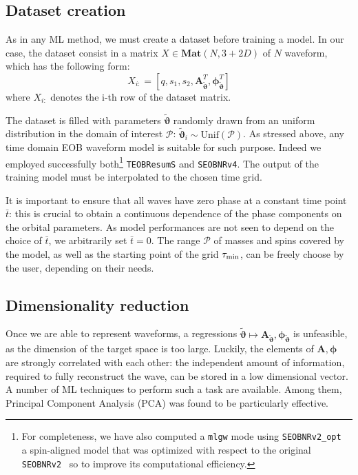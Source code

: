 \documentclass[twocolumn,showpacs,preprintnumbers,nofootinbib,prd,
superscriptaddress,10pt]{revtex4-1}
\begin{document}
\subsection{Dataset creation}
\label{sec:trainingset}
As in any ML method, we must create a dataset before training a model.
In our case, the dataset consist in a matrix ${X \in \mathbf{Mat}(N,3+2D)}$ of $N$ waveform, which has the following form:
\begin{equation} \label{eq:dataset}
	X_{i:} = [q,s_1,s_2, \boldsymbol{A}_{{\tilde{\boldsymbol{\vartheta}}}}^T, \boldsymbol{\phi}_{{\tilde{\boldsymbol{\vartheta}}}}^T]
\end{equation}
where $X_{i:}$ denotes the i-th row of the dataset matrix.

The dataset is filled with parameters ${\tilde{\boldsymbol{\vartheta}}}$ randomly drawn from an uniform distribution in the domain of interest $\mathcal{P}$: ${\tilde{\boldsymbol{\vartheta}}}_i \sim \textrm{Unif}(\mathcal{P})$.
As stressed above, any time domain EOB waveform model is suitable for such purpose. Indeed we employed 
successfully both\footnote{For completeness, we have also computed a {\tt mlgw} 
mode using \texttt{SEOBNRv2\_opt}~\cite{Devine:2016ovp}  a spin-aligned model that was optimized
with respect to the original \texttt{SEOBNRv2}~\cite{Taracchini:2013rva} 
so to improve its computational efficiency.} \texttt{TEOBResumS} and \texttt{SEOBNRv4}.
The output of the training model must be interpolated to the chosen time grid.

It is important to ensure that all waves have zero phase at a constant
time point $\bar{t}$: this is crucial to obtain a continuous
dependence of the phase components on the orbital parameters. As model
performances are not seen to depend on the choice of
$\bar{t}$, we arbitrarily set $\bar{t} = 0$.
The range $\mathcal{P}$ of masses and spins covered by the model, as 
well as the starting point of the grid $\tau_{\rm min}$, can be freely choose 
by the user, depending on their needs.


\subsection{Dimensionality reduction}
Once we are able to represent waveforms, a regressions ${\tilde{\boldsymbol{\vartheta}}} \longmapsto \boldsymbol{A}_{{\tilde{\boldsymbol{\vartheta}}}}, \boldsymbol{\phi}_{{\tilde{\boldsymbol{\vartheta}}}}$ is unfeasible, as the dimension of the target space is too large. Luckily, the elements of $\boldsymbol{A}, \boldsymbol{\phi}$ are strongly correlated with each other: the independent amount of information, required to fully reconstruct the wave, can be stored in a low dimensional vector.
A number of ML techniques to perform such a task are available. Among them, Principal Component Analysis (PCA) \cite[ch. 12]{murphy2012machine} was found to be particularly effective.
\end{document}
